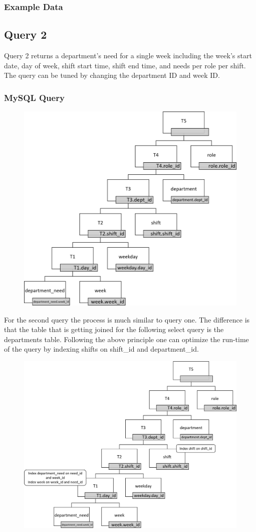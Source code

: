 \documentclass[letter,12pt]{texMemo}
\begin{document}
\subsubsection*{Example Data}
	


\subsection*{Query 2}
Query 2 returns a department's need for a single week including the week's start date, day of week, shift start time, shift end time, and needs per role per shift. The query can be tuned by changing the department ID and week ID.

\subsubsection*{MySQL Query}
	
\begin{figure}[H]
	\centering
	\includegraphics[width=.75\textwidth]{query2.png}
\end{figure}
For the second query the process is much similar to query one. The difference is that the table that is getting joined for the following select query is the departments table. Following the above principle one can optimize the run-time of the query by indexing shifts on shift\_id and department\_id. 
\begin{figure}[H]
	\centering
	\includegraphics[width=.75\textwidth]{query2_indexed.png}
\end{figure}
\end{document}
